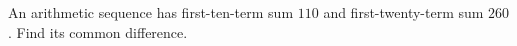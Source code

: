 An arithmetic sequence has first-ten-term sum $110$ and first-twenty-term sum $260$. Find its common difference.
